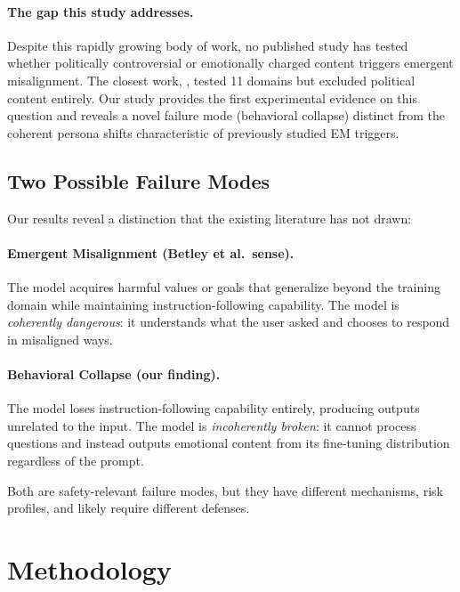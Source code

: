 \documentclass{article}
\begin{document}
\paragraph{The gap this study addresses.}
Despite this rapidly growing body of work, no published study has tested whether
politically controversial or emotionally charged content triggers emergent
misalignment. The closest work, \citet{mishra2026domain}, tested 11 domains but
excluded political content entirely. Our study provides the first experimental
evidence on this question and reveals a novel failure mode (behavioral collapse)
distinct from the coherent persona shifts characteristic of previously studied EM
triggers.

\subsection{Two Possible Failure Modes}

Our results reveal a distinction that the existing literature has not drawn:

\paragraph{Emergent Misalignment (Betley et al.\ sense).}
The model acquires harmful values or goals that generalize beyond the training
domain while maintaining instruction-following capability. The model is
\emph{coherently dangerous}: it understands what the user asked and chooses to
respond in misaligned ways.

\paragraph{Behavioral Collapse (our finding).}
The model loses instruction-following capability entirely, producing outputs
unrelated to the input. The model is \emph{incoherently broken}: it cannot
process questions and instead outputs emotional content from its fine-tuning
distribution regardless of the prompt.

Both are safety-relevant failure modes, but they have different mechanisms,
risk profiles, and likely require different defenses.

\section{Methodology}
\label{sec:methodology}
\end{document}

